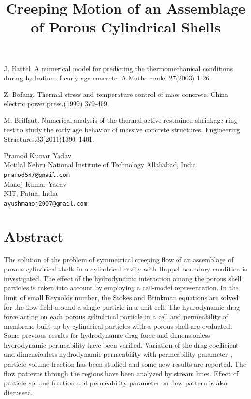 \documentclass[article, A4, 11pt]{llncs}%
\begin{document}

\begin{thebibliography}{10}
{\sc J. Hattel}. {A numerical model for predicting the thermomechanical conditions during hydration of early age concrete}. A.Mathe.model.27(2003) 1-26.

{\sc Z. Bofang}. {Thermal stress and temperature control of mass concrete}. China electric power press.(1999) 379-409.

{\sc M. Briffaut}. {Numerical analysis of the thermal active restrained shrinkage ring test to study the early age behavior of massive concrete structures}. Engineering Structures.33(2011)1390–1401.
\end{thebibliography} %

\title{Creeping Motion of an Assemblage of Porous Cylindrical Shells}
 \author{} \institute{}
\maketitle
\begin{center}
{\large \underline{Pramod Kumar Yadav}}\\
Motilal Nehru National Institute of Technology Allahabad, India\\
{\tt pramod547@gmail.com}
\\ \vspace{4mm}
{\large Manoj Kumar Yadav}\\
NIT, Patna, India\\
{\tt ayushmanoj2007@gmail.com}
\end{center}

\section*{Abstract}
The solution of the problem of symmetrical creeping flow of an assemblage of porous cylindrical shells in a cylindrical cavity with Happel boundary  condition is investigated. The effect of the hydrodynamic interaction among the porous shell particles is taken into account by employing a cell-model representation. In the limit of small Reynolds number, the Stokes and Brinkman equations are solved for the flow field around a single particle in a unit cell. The hydrodynamic drag force acting on each porous cylindrical particle in a cell and permeability of membrane built up by cylindrical particles with a porous shell are evaluated. Some previous results for hydrodynamic drag force and dimensionless hydrodynamic permeability have been verified. Variation of the drag coefficient and dimensionless hydrodynamic permeability with permeability parameter , particle volume fraction   has been studied and some new results are reported. The flow patterns through the regions have been analyzed by stream lines. Effect of particle volume fraction  and permeability parameter on flow pattern is also discussed.
\end{document}
